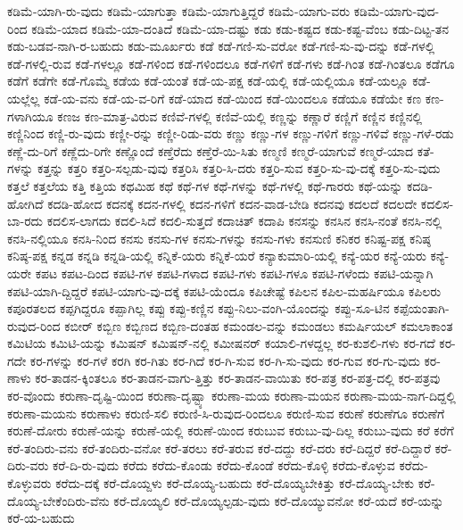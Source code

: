{ಕಡಿಮೆ-ಯಾಗಿ-ರು-ವುದು
ಕಡಿಮೆ-ಯಾಗುತ್ತಾ
ಕಡಿಮೆ-ಯಾಗುತ್ತಿದ್ದರೆ
ಕಡಿಮೆ-ಯಾಗು-ವರು
ಕಡಿಮೆ-ಯಾಗು-ವುದ-ರಿಂದ
ಕಡಿಮೆ-ಯಾದ
ಕಡಿಮೆ-ಯಾ-ದಂತಿದೆ
ಕಡಿಮೆ-ಯಾ-ದಷ್ಟು
ಕಡು
ಕಡು-ಕಷ್ಟದ
ಕಡು-ಕಷ್ಟ-ವೆಂಬ
ಕಡು-ದಿಟ್ಟ-ತನ
ಕಡು-ಬಡವ-ನಾಗಿ-ರ-ಬಹುದು
ಕಡು-ಮೂರ್ಖರು
ಕಡೆ
ಕಡೆ-ಗಣಿ-ಸು-ವರೋ
ಕಡೆ-ಗಣಿ-ಸು-ವು-ದನ್ನು
ಕಡೆ-ಗಳಲ್ಲಿ
ಕಡೆ-ಗಳಲ್ಲಿ-ರುವ
ಕಡೆ-ಗಳಲ್ಲೂ
ಕಡೆ-ಗಳಿಂದ
ಕಡೆ-ಗಳಿಂದಲೂ
ಕಡೆ-ಗಳಿಗೆ
ಕಡೆ-ಗಳು
ಕಡೆ-ಗಿಂತ
ಕಡೆ-ಗಿಂತಲೂ
ಕಡೆಗೂ
ಕಡೆಗೆ
ಕಡೆಗೇ
ಕಡೆ-ಗೊಮ್ಮೆ
ಕಡೆಯ
ಕಡೆ-ಯಂತೆ
ಕಡೆ-ಯ-ಪಕ್ಷ
ಕಡೆ-ಯಲ್ಲಿ
ಕಡೆ-ಯಲ್ಲಿಯೂ
ಕಡೆ-ಯಲ್ಲೂ
ಕಡೆ-ಯಲ್ಲೆಲ್ಲ
ಕಡೆ-ಯ-ವನು
ಕಡೆ-ಯ-ವ-ರಿಗೆ
ಕಡೆ-ಯಾದ
ಕಡೆ-ಯಿಂದ
ಕಡೆ-ಯಿಂದಲೂ
ಕಡೆಯೂ
ಕಡೆಯೇ
ಕಣ
ಕಣ-ಗಳಾಗಿಯೂ
ಕಣಜ
ಕಣ-ಮಾತ್ರ-ವಿರುವ
ಕಣಿವೆ-ಗಳಲ್ಲಿ
ಕಣಿವೆ-ಯಲ್ಲಿ
ಕಣ್ಣನ್ನು
ಕಣ್ಣಾರೆ
ಕಣ್ಣಿಗೆ
ಕಣ್ಣಿನ
ಕಣ್ಣಿನಲ್ಲಿ
ಕಣ್ಣಿನಿಂದ
ಕಣ್ಣಿ-ರು-ವುದು
ಕಣ್ಣೀ-ರನ್ನು
ಕಣ್ಣೀ-ರಿಡು-ವರು
ಕಣ್ಣು
ಕಣ್ಣು-ಗಳ
ಕಣ್ಣು-ಗಳಿಗೆ
ಕಣ್ಣು-ಗಳಿವೆ
ಕಣ್ಣು-ಗಳೆ-ರಡು
ಕಣ್ಣೆ-ದು-ರಿಗೆ
ಕಣ್ಣೆದು-ರಿಗೇ
ಕಣ್ಣೊಂದೆ
ಕಣ್ತೆರೆದು
ಕಣ್ತೆರೆ-ಯಿ-ಸಿತು
ಕಣ್ಮಣಿ
ಕಣ್ಮರೆ-ಯಾಗುವೆ
ಕಣ್ಮರೆ-ಯಾದ
ಕತೆ-ಗಳನ್ನು
ಕತ್ತನ್ನು
ಕತ್ತರಿ
ಕತ್ತರಿ-ಸಲ್ಪಡು-ವುವು
ಕತ್ತರಿಸಿ
ಕತ್ತರಿ-ಸಿ-ದರು
ಕತ್ತರಿ-ಸುವ
ಕತ್ತರಿ-ಸು-ವು-ದಕ್ಕೆ
ಕತ್ತರಿ-ಸು-ವುದು
ಕತ್ತಲೆ
ಕತ್ತಲೆಯ
ಕತ್ತಿ
ಕತ್ತಿಯ
ಕಥಮಿಹ
ಕಥೆ
ಕಥೆ-ಗಳ
ಕಥೆ-ಗಳನ್ನು
ಕಥೆ-ಗಳಲ್ಲಿ
ಕಥೆ-ಗಾರರು
ಕಥೆ-ಯನ್ನು
ಕದಡಿ-ಹೋಗಿದೆ
ಕದಡಿ-ಹೋದ
ಕದನಕ್ಕೆ
ಕದನ-ಗಳಲ್ಲಿ
ಕದನ-ಗಳಿಗೆ
ಕದನ-ವಾಡ-ಬೇಡಿ
ಕದನವು
ಕದಲದೆ
ಕದಲದೇ
ಕದಲಿಸ-ಬಾ-ರದು
ಕದಲಿಸ-ಲಾಗದು
ಕದಲಿ-ಸಿದೆ
ಕದಲಿ-ಸುತ್ತದೆ
ಕದಾಚಿತ್
ಕದಾಪಿ
ಕನಸನ್ನು
ಕನಸಿನ
ಕನಸಿ-ನಂತೆ
ಕನಸಿ-ನಲ್ಲಿ
ಕನಸಿ-ನಲ್ಲಿಯೂ
ಕನಸಿ-ನಿಂದ
ಕನಸು
ಕನಸು-ಗಳ
ಕನಸು-ಗಳನ್ನು
ಕನಸು-ಗಳು
ಕನಸುಣಿ
ಕನಿಕರ
ಕನಿಷ್ಟ-ಪಕ್ಷ
ಕನಿಷ್ಠ
ಕನಿಷ್ಠ-ಪಕ್ಷ
ಕನ್ನಡ
ಕನ್ನಡಿ
ಕನ್ನಡಿ-ಯಲ್ಲಿ
ಕನ್ನಿಕೆ-ಯರು
ಕನ್ನಿಕೆ-ಯರೆ
ಕನ್ಯಾಕುಮಾರಿ-ಯಲ್ಲಿ
ಕನ್ಯೆ-ಯರ
ಕನ್ಯೆ-ಯರು
ಕನ್ಯೆ-ಯರೇ
ಕಪಟ
ಕಪಟ-ದಿಂದ
ಕಪಟಿ-ಗಳ
ಕಪಟಿ-ಗಳಾದ
ಕಪಟಿ-ಗಳು
ಕಪಟಿ-ಗಳೂ
ಕಪಟಿ-ಗಳೆಂದು
ಕಪಟಿ-ಯನ್ನಾಗಿ
ಕಪಟಿ-ಯಾಗಿ-ದ್ದಿದ್ದರೆ
ಕಪಟಿ-ಯಾಗು-ವು-ದಕ್ಕೆ
ಕಪಟಿ-ಯೆಂದೂ
ಕಪಿಚೇಷ್ಟೆ
ಕಪಿಲನ
ಕಪಿಲ-ಮಹರ್ಷಿಯೂ
ಕಪಿಲರು
ಕಪೂರತಲದ
ಕಪ್ಪಗಿದ್ದರೂ
ಕಪ್ಪಾಗಿಲ್ಲ
ಕಪ್ಪು
ಕಪ್ಪು-ಕಣ್ಣಿನ
ಕಪ್ಪು-ನಿಲು-ವಂಗಿ-ಯೊಂದನ್ನು
ಕಪ್ಪು-ಸೂ-ಟಿನ
ಕಪ್ಪೆಯಂತಾಗಿ-ರುವುದ-ರಿಂದ
ಕಬೀರ್
ಕಬ್ಬಿಣ
ಕಬ್ಬಿಣದ
ಕಬ್ಬಿಣ-ದಂತಹ
ಕಮಂಡಲ-ವನ್ನು
ಕಮಂಡಲು
ಕಮರ್ಷಿಯಲ್
ಕಮಲಾಕಾಂತ
ಕಮಿಟಿಯ
ಕಮಿಟಿ-ಯನ್ನು
ಕಮಿಷನ್
ಕಮಿಷನ್-ನಲ್ಲಿ
ಕಮೀಷನರ್
ಕಯಾಲಿ-ಗಳದ್ದಲ್ಲ
ಕರ-ಕುಶಲಿ-ಗಳು
ಕರ-ಗದೆ
ಕರ-ಗದೇ
ಕರ-ಗಳನ್ನು
ಕರ-ಗಳೆ
ಕರಗಿ
ಕರ-ಗಿತು
ಕರ-ಗಿದೆ
ಕರ-ಗಿ-ಸುವ
ಕರ-ಗಿ-ಸು-ವುದು
ಕರ-ಗುವ
ಕರ-ಗು-ವುದು
ಕರ-ಣಾಳು
ಕರ-ತಾಡನ-ಕ್ಕಿಂತಲೂ
ಕರ-ತಾಡನ-ವಾಗು-ತ್ತಿತ್ತು
ಕರ-ತಾಡನ-ವಾಯಿತು
ಕರ-ಪತ್ರ
ಕರ-ಪತ್ರ-ದಲ್ಲಿ
ಕರ-ಪತ್ರವು
ಕರ-ವೊಂದು
ಕರುಣಾ-ದೃಷ್ಟಿ-ಯಿಂದ
ಕರುಣಾ-ದೃಷ್ಟ್ಯಾ
ಕರುಣಾ-ಮಯ
ಕರುಣಾ-ಮಯನ
ಕರುಣಾ-ಮಯ-ನಾಗ-ದಿದ್ದಲ್ಲಿ
ಕರುಣಾ-ಮಯನು
ಕರುಣಾಳು
ಕರುಣಿ-ಸಲಿ
ಕರುಣಿ-ಸಿ-ರುವುದ-ರಿಂದಲೂ
ಕರುಣಿ-ಸುವ
ಕರುಣೆ
ಕರುಣೆಗೂ
ಕರುಣೆಗೆ
ಕರುಣೆ-ದೋರು
ಕರುಣೆ-ಯನ್ನು
ಕರುಣೆ-ಯಲ್ಲಿ
ಕರುಣೆ-ಯಿಂದ
ಕರುಬುವ
ಕರುಬು-ವು-ದಿಲ್ಲ
ಕರುಬು-ವುದು
ಕರೆ
ಕರೆಗೆ
ಕರೆ-ತಂದಿರು-ವನು
ಕರೆ-ತಂದಿರು-ವನೋ
ಕರೆ-ತರಲು
ಕರೆ-ತರುವ
ಕರೆ-ದದ್ದು
ಕರೆ-ದರು
ಕರೆ-ದಿದ್ದರೆ
ಕರೆ-ದಿದ್ದಾರೆ
ಕರೆ-ದಿರು-ವರು
ಕರೆ-ದಿ-ರು-ವುದು
ಕರೆದು
ಕರೆದು-ಕೊಂಡು
ಕರೆದು-ಕೊಂಡೆ
ಕರೆದು-ಕೊಳ್ಳಿ
ಕರೆದು-ಕೊಳ್ಳುವ
ಕರೆದು-ಕೊಳ್ಳುವರು
ಕರೆದು-ದಕ್ಕೆ
ಕರೆ-ದೊಯ್ದಳು
ಕರೆ-ದೊಯ್ಯ-ಬಹುದು
ಕರೆ-ದೊಯ್ಯಬೇಕಿತ್ತು
ಕರೆ-ದೊಯ್ಯ-ಬೇಕು
ಕರೆ-ದೊಯ್ಯ-ಬೇಕೆಂದಿರು-ವೆನು
ಕರೆ-ದೊಯ್ಯಲಿ
ಕರೆ-ದೊಯ್ಯಲ್ಪಡು-ವುದು
ಕರೆ-ದೊಯ್ಯುವನೋ
ಕರೆ-ಯದೆ
ಕರೆ-ಯನ್ನು
ಕರೆ-ಯ-ಬಹುದು
}
